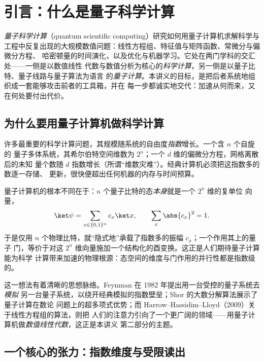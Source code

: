 \chapter*{引言：什么是量子科学计算}

\emph{量子科学计算}（quantum scientific computing）研究如何用量子计算机求解科学与
工程中反复出现的大规模数值问题：线性方程组、特征值与矩阵函数、常微分与偏微分方程、
哈密顿量的时间演化，以及优化与机器学习。它处在两门学科的交汇处——一侧是以数值线性
代数与数值分析为核心的\emph{科学计算}，另一侧是以量子比特、量子线路与量子算法为语言
的\emph{量子计算}。本讲义的目标，是把后者系统地组织成一套能够攻击前者的工具箱，并在
每一步都诚实地交代：加速从何而来，又在何处要付出代价。

\section*{为什么要用量子计算机做科学计算}

许多最重要的科学计算问题，其规模随系统的自由度\emph{指数}增长。一个含 $n$ 个自旋的
量子多体系统，其希尔伯特空间维数为 $2^n$；一个 $d$ 维的偏微分方程，网格离散后的未知
量个数随 $d$ 指数增长（所谓``维数灾难''）。经典计算机必须把这指数多的数逐一存储、
更新，很快便超出任何机器的内存与时间预算。

量子计算机的根本不同在于：$n$ 个量子比特的态\emph{本身}就是一个 $2^n$ 维的复单位
向量，
\[
  \ket\psi=\sum_{x\in\{0,1\}^n} c_x\ket x,\qquad \sum_x\abs{c_x}^2=1 .
\]
于是仅用 $n$ 个物理比特，就``隐式地''承载了指数多的振幅 $c_x$；一个作用其上的量子
门，等价于对这 $2^n$ 维向量施加一个结构化的酉变换。这正是人们期待量子计算能为科学
计算带来加速的物理根源：态空间的维度与门作用的并行性都是指数级的。

这一想法有着清晰的思想脉络。Feynman 在 1982 年提出用一台受控的量子系统去\emph{模拟}
另一台量子系统，以绕开经典模拟的指数壁垒；Shor 的大数分解算法展示了量子计算在数论
问题上的超多项式优势；而 Harrow--Hassidim--Lloyd（2009）关于线性方程组的算法，则把
人们的注意力引向了一个更广阔的领域——用量子计算机做\emph{数值线性代数}，这正是本讲义
第二部分的主题。

\section*{一个核心的张力：指数维度与受限读出}

